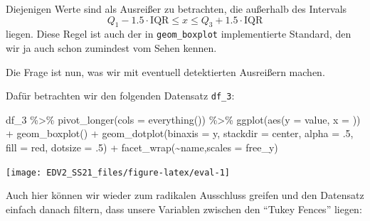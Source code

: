 \documentclass[
]{book}
\newenvironment{Shaded}{\begin{snugshade}}{\end{snugshade}}
\newcommand{\AttributeTok}[1]{\textcolor[rgb]{0.77,0.63,0.00}{#1}}
\newcommand{\DecValTok}[1]{\textcolor[rgb]{0.00,0.00,0.81}{#1}}
\newcommand{\FunctionTok}[1]{\textcolor[rgb]{0.00,0.00,0.00}{#1}}
\newcommand{\NormalTok}[1]{#1}
\newcommand{\SpecialCharTok}[1]{\textcolor[rgb]{0.00,0.00,0.00}{#1}}
\newcommand{\StringTok}[1]{\textcolor[rgb]{0.31,0.60,0.02}{#1}}
\begin{document}
Diejenigen Werte sind als Ausreißer zu betrachten, die außerhalb des Intervals
\[Q_1 - 1.5 \cdot \text{IQR} \leq x \leq Q_3 + 1.5 \cdot \text{IQR}\]
liegen. Diese Regel ist auch der in \texttt{geom\_boxplot} implementierte Standard, den wir ja auch schon zumindest vom Sehen kennen.

Die Frage ist nun, was wir mit eventuell detektierten Ausreißern machen.

Dafür betrachten wir den folgenden Datensatz \texttt{df\_3}:

\begin{Shaded}
\begin{Highlighting}[]
\NormalTok{df\_3 }\SpecialCharTok{\%\textgreater{}\%} 
  \FunctionTok{pivot\_longer}\NormalTok{(}\AttributeTok{cols =} \FunctionTok{everything}\NormalTok{()) }\SpecialCharTok{\%\textgreater{}\%} 
  \FunctionTok{ggplot}\NormalTok{(}\FunctionTok{aes}\NormalTok{(}\AttributeTok{y =}\NormalTok{ value, }\AttributeTok{x =} \StringTok{\textquotesingle{}\textquotesingle{}}\NormalTok{)) }\SpecialCharTok{+}
  \FunctionTok{geom\_boxplot}\NormalTok{() }\SpecialCharTok{+}
  \FunctionTok{geom\_dotplot}\NormalTok{(}\AttributeTok{binaxis =} \StringTok{\textquotesingle{}y\textquotesingle{}}\NormalTok{,}
               \AttributeTok{stackdir =} \StringTok{\textquotesingle{}center\textquotesingle{}}\NormalTok{,}
               \AttributeTok{alpha =}\NormalTok{ .}\DecValTok{5}\NormalTok{,}
               \AttributeTok{fill =} \StringTok{\textquotesingle{}red\textquotesingle{}}\NormalTok{,}
               \AttributeTok{dotsize =}\NormalTok{ .}\DecValTok{5}\NormalTok{) }\SpecialCharTok{+}
  \FunctionTok{facet\_wrap}\NormalTok{(}\SpecialCharTok{\textasciitilde{}}\NormalTok{name,}\AttributeTok{scales =} \StringTok{\textquotesingle{}free\_y\textquotesingle{}}\NormalTok{)}
\end{Highlighting}
\end{Shaded}

\begin{center}\texttt{[image: EDV2\_SS21\_files/figure-latex/eval-1]} \end{center}

Auch hier können wir wieder zum radikalen Ausschluss greifen und den Datensatz einfach danach filtern, dass unsere Variablen zwischen den ``Tukey Fences'' liegen:
\end{document}
